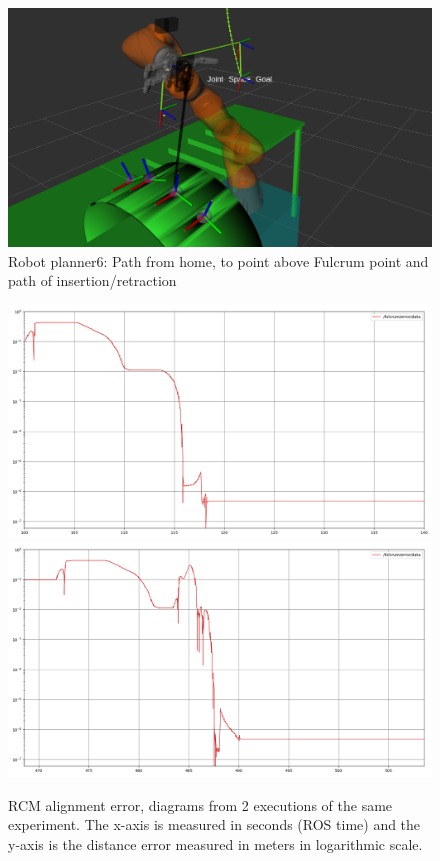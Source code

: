 \begin{center}
\begin{figure}[!htb]
\centering
\includegraphics[width=\textwidth]{images/robot_planner6/robot_planner6.png}
\caption{Robot planner6: Path from home, to point above Fulcrum point and path of insertion/retraction}
\end{figure}
\end{center}

\begin{center}
\begin{figure}[!htb]
\centering
\includegraphics[width=\textwidth]{images/robot_planner6/rcm_fulcrum_alignment_error.png}
\includegraphics[width=\textwidth]{images/robot_planner6/rcm_fulcrum_alignment_error2.png}\\
\caption{RCM alignment error, diagrams from 2 executions of the same experiment. The x-axis is measured in seconds (ROS time) and the y-axis is the distance error measured in meters in logarithmic scale.}
\end{figure}
\end{center}

